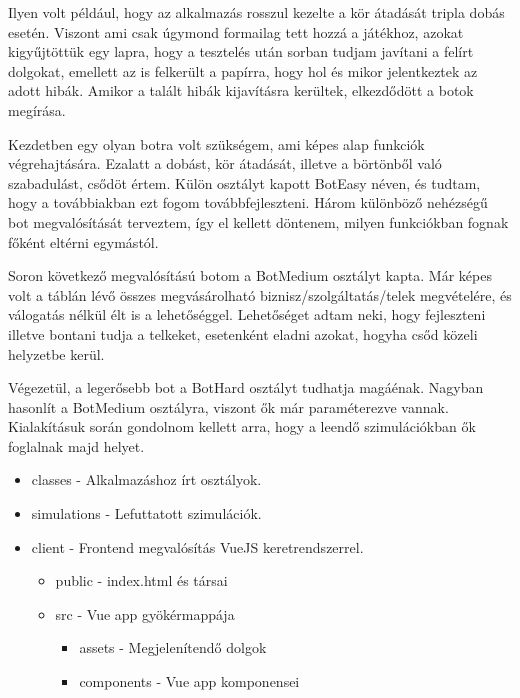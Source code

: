 Ilyen volt például, hogy az alkalmazás rosszul kezelte a kör átadását tripla dobás esetén. Viszont ami csak úgymond formailag tett hozzá a játékhoz, azokat kigyűjtöttük egy lapra, hogy a tesztelés után sorban tudjam javítani a felírt dolgokat, emellett az is felkerült a papírra, hogy hol és mikor jelentkeztek az adott hibák. Amikor a talált hibák kijavításra kerültek, elkezdődött a botok megírása.

Kezdetben egy olyan botra volt szükségem, ami képes alap funkciók végrehajtására. Ezalatt a dobást, kör átadását, illetve a börtönből való szabadulást, csődöt értem. Külön osztályt kapott BotEasy néven, és tudtam, hogy a továbbiakban ezt fogom továbbfejleszteni. Három különböző nehézségű bot megvalósítását terveztem, így el kellett döntenem, milyen funkciókban fognak főként eltérni egymástól.

Soron következő megvalósítású botom a BotMedium osztályt kapta. Már képes volt a táblán lévő összes megvásárolható biznisz/szolgáltatás/telek megvételére, és válogatás nélkül élt is a lehetőséggel. Lehetőséget adtam neki, hogy fejleszteni illetve bontani tudja a telkeket, esetenként eladni azokat, hogyha csőd közeli helyzetbe kerül.

Végezetül, a legerősebb bot a BotHard osztályt tudhatja magáénak. Nagyban hasonlít a BotMedium osztályra, viszont ők már paraméterezve vannak. Kialakításuk során gondolnom kellett arra, hogy a leendő szimulációkban ők foglalnak majd helyet.

\newpage
{}

\renewcommand{\labelitemi}{$\blacksquare$}
 \renewcommand\labelitemii{$\square$}
 \begin{itemize}
   \item  classes - Alkalmazáshoz írt osztályok.
   \item simulations - Lefuttatott szimulációk.
\item client - Frontend megvalósítás VueJS keretrendszerrel.

   \begin{itemize}
     \item  public - index.html és társai
     \item src - Vue app gyökérmappája
     \begin{itemize}
       \item  assets - Megjelenítendő dolgok
	\item components - Vue app komponensei

     \end{itemize}
   \end{itemize}
 \end{itemize}

